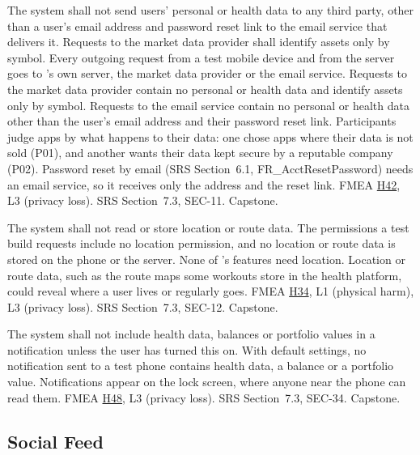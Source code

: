 \documentclass{article}
\newcommand{\hazref}[1]{\hyperref[#1]{#1}}
\begin{document}
\begin{description}
{The system shall not send users' personal or health data to any third party,
other than a user's email address and password reset link to the email service
that delivers it. Requests to the market data provider shall identify assets
only by symbol.}
{Every outgoing request from a test mobile device and from the server goes to
\progname{}'s own server, the market data provider or the email service.
Requests to the market data provider contain no personal or health data and
identify assets only by symbol. Requests to the email service contain no
personal or health data other than the user's email address and their password
reset link.}
{Participants judge apps by what happens to their data: one chose apps where
their data is not sold (P01), and another wants their data kept secure by a
reputable company (P02). Password reset by email (SRS Section~6.1,
FR\_AcctResetPassword) needs an email service, so it receives only the address
and the reset link.}
{FMEA \hazref{H42}, L3 (privacy loss).}
{SRS Section~7.3, SEC-11.}
{Capstone.}

{The system shall not read or store location or route data.}
{The permissions a test build requests include no location permission, and no
location or route data is stored on the phone or the server.}
{None of \progname{}'s features need location. Location or route data, such as
the route maps some workouts store in the health platform, could reveal where a
user lives or regularly goes.}
{FMEA \hazref{H34}, L1 (physical harm), L3 (privacy loss).}
{SRS Section~7.3, SEC-12.}
{Capstone.}


{The system shall not include health data, balances or portfolio values in a
notification unless the user has turned this on.}
{With default settings, no notification sent to a test phone contains health
data, a balance or a portfolio value.}
{Notifications appear on the lock screen, where anyone near the phone can read
them.}
{FMEA \hazref{H48}, L3 (privacy loss).}
{SRS Section~7.3, SEC-34.}
{Capstone.}

\end{description}

\subsection{Social Feed}
\end{document}
